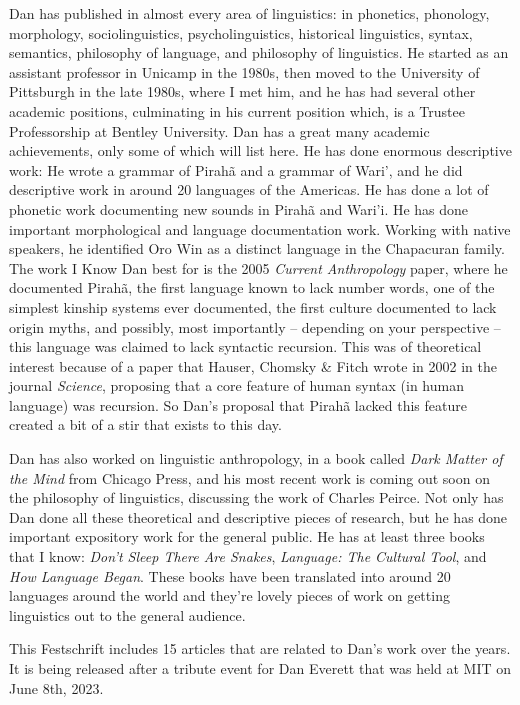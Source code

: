 \documentclass[output=paper,colorlinks,citecolor=brown
]{langscibook}
\begin{document}
Dan has published in almost every area of linguistics: in phonetics, phonology, morphology, sociolinguistics, psycholinguistics, historical linguistics, syntax, semantics, philosophy of language, and philosophy of linguistics. He started as an assistant professor in Unicamp in the 1980s, then moved to the University of Pittsburgh in the late 1980s, where I met him, and he has had several other academic positions, culminating in his current position which, is a Trustee Professorship at  Bentley University. Dan has a great many academic achievements, only some of which will list here. He has done enormous descriptive work: He wrote  a grammar of Pirahã and a grammar of Wari', and he did descriptive work in around 20 languages of the Americas. He has done a lot of phonetic work documenting new sounds in Pirahã and Wari'i. He has done important morphological and language documentation work. Working with native speakers, he identified Oro Win as a distinct language in the Chapacuran family. The work I Know Dan best for is the 2005 \textit{Current Anthropology} paper, where he documented Pirahã, the first language known to lack number words, one of the simplest kinship systems ever documented, the first culture documented to lack origin myths, and possibly, most importantly -- depending on your perspective -- this language was claimed to lack syntactic recursion. This was of theoretical interest because of a paper that Hauser, Chomsky \& Fitch wrote in 2002 in the journal \textit{Science}, proposing that a core feature of human syntax (in human language) was recursion. So Dan's proposal that Pirahã lacked this feature created a bit of a stir that exists to this day.

Dan has also worked on linguistic anthropology, in a book called \textit{Dark Matter of the Mind} from Chicago Press, and his most recent work is coming out soon on the philosophy of linguistics, discussing the work of Charles Peirce.  Not only has Dan done all these theoretical and descriptive pieces of research, but he has done important expository work for the general public. He has at least three books that I know: \textit{Don't Sleep There Are Snakes}, \textit{Language: The Cultural Tool}, and \textit{How Language Began}. These books have been translated into around 20 languages around the world and they're lovely pieces of work on getting linguistics out to the general audience. 

This Festschrift includes 15 articles that are related to Dan's work over the years. It is being released after a tribute event for Dan Everett that was held at MIT on June 8th, 2023. 

\sloppy
\end{document}
